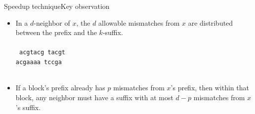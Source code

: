 \documentclass[pdf,xcolor={dvipsnames}]{beamer}
\begin{document}
	\begin{frame}{Speedup technique}{Key observation}
		\begin{itemize}
			\item In a $d$-neighbor of $x$, the $d$ allowable mismatches from $x$ are distributed between the prefix and the $k$-suffix.\\\ \\
			\texttt{\large\centering
				acgtacg tacgt\\
				acg{\color{red}a}a{\color{red}aa} t{\color{red}c}cg{\color{red}a}\\\ \\
			}
			\item If a {block's prefix already has $p$ mismatches} from $x$'s prefix, then within that block, {any neighbor must have a suffix with at most $d-p$ mismatches} from $x$'s suffix.
		\end{itemize}

	\end{frame}
\end{document}
